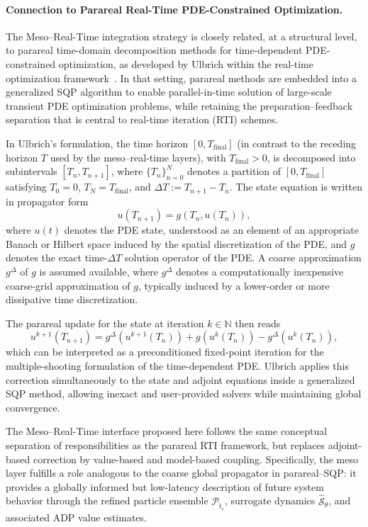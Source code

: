 \documentclass{article}
\newcommand{\1}{\mathds{1}}          %
\theoremstyle{definition}
\begin{document}
\begin{sloppypar}
\paragraph{Connection to Parareal Real-Time PDE-Constrained Optimization.}
The Meso--Real-Time integration strategy is closely related, at a structural level,
to parareal time-domain decomposition methods for time-dependent
PDE-constrained optimization, as developed by Ulbrich within the real-time
optimization framework~\cite{inbookUlbrich2007}. In that setting, parareal methods are embedded into a generalized SQP algorithm to enable parallel-in-time solution of large-scale transient PDE optimization problems, while retaining the preparation--feedback separation that is central to real-time iteration (RTI) schemes.

In Ulbrich’s formulation, the time horizon $[0,T_{\mathrm{final}}]$ (in contrast to the receding horizon $T$
used by the meso--real-time layers), with
$T_{\mathrm{final}}>0$, is decomposed into subintervals $[T_n,T_{n+1}]$,
where $\{T_n\}_{n=0}^N$ denotes a partition of $[0,T_{\mathrm{final}}]$ satisfying
$T_0=0$, $T_N=T_{\mathrm{final}}$, and $\Delta T := T_{n+1}-T_n$.
The state equation is written in propagator form
\[
  u(T_{n+1}) = g(T_n,u(T_n)),
\]
where $u(t)$ denotes the PDE state, understood as an element of an appropriate
Banach or Hilbert space induced by the spatial discretization of the PDE, and
$g$ denotes the exact time-$\Delta T$ solution operator of the PDE.
A coarse approximation $g^{\Delta}$ of $g$ is assumed available, where
$g^{\Delta}$ denotes a computationally inexpensive coarse-grid approximation
of $g$, typically induced by a lower-order or more dissipative time
discretization.

The parareal update for the state at iteration $k\in\mathbb{N}$ then reads
\begin{equation}
  u^{k+1}(T_{n+1})
  =
  g^{\Delta}\!\left(u^{k+1}(T_n)\right)
  +
  g\!\left(u^{k}(T_n)\right)
  -
  g^{\Delta}\!\left(u^{k}(T_n)\right),
  \label{eq:parareal_ulbrich}
\end{equation}
which can be interpreted as a preconditioned fixed-point iteration for the
multiple-shooting formulation of the time-dependent PDE.
Ulbrich applies this correction simultaneously to the state and adjoint equations
inside a generalized SQP method, allowing inexact and user-provided solvers while
maintaining global convergence.

The Meso--Real-Time interface proposed here follows the same conceptual
separation of responsibilities as the parareal RTI framework, but replaces
adjoint-based correction by value-based and model-based coupling.
Specifically, the meso layer fulfills a role analogous to the coarse global
propagator in parareal--SQP: it provides a globally informed but low-latency
description of future system behavior through the refined particle ensemble
$\mathcal{P}_{\hat t_c}$, surrogate dynamics $\hat{\mathcal{S}}_{\theta}$, and
associated ADP value estimates.


\end{sloppypar}
\end{document}
